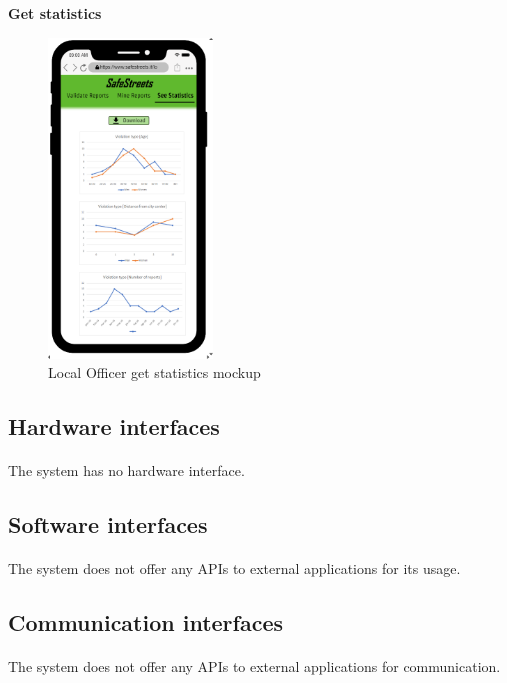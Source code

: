 					\clearpage
					\vspace{-2mm}
				\begin{center}
					{\small \textbf{Get statistics}}
				\end{center}
				\vspace{-5mm}
				\begin{figure}[!h]
					\centering
					\includegraphics[height=8.5cm]{images/MockUp/Authority/LocalOfficer/SeeStatistics.png}
					\caption{Local Officer get statistics mockup}
				\end{figure}
			\subsection{Hardware interfaces}
				\paragraph{}
					The system has no hardware interface.
			\subsection{Software interfaces}
				\paragraph{}
					The system does not offer any APIs to external applications for its usage.
			\subsection{Communication interfaces}
				\paragraph{}
					The system does not offer any APIs to external applications for communication.
